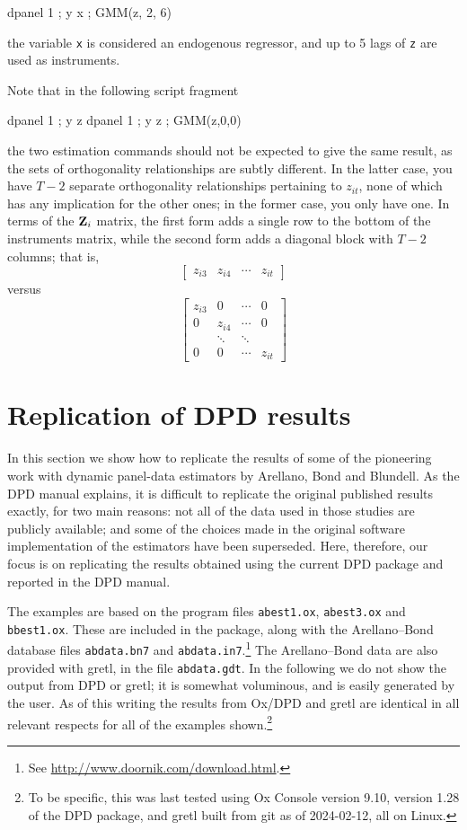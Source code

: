 \begin{code}
  dpanel 1 ; y x ; GMM(z, 2, 6)
\end{code}
the variable \texttt{x} is considered an endogenous regressor, and up to
5 lags of \texttt{z} are used as instruments.

Note that in the following script fragment
\begin{code}
  dpanel 1 ; y z
  dpanel 1 ; y z ; GMM(z,0,0)
\end{code}
the two estimation commands should not be expected to give the same
result, as the sets of orthogonality relationships are subtly
different.  In the latter case, you have $T-2$ separate orthogonality
relationships pertaining to $z_{it}$, none of which has any
implication for the other ones; in the former case, you only have one.
In terms of the $\mathbf{Z}_i$ matrix, the first form adds a single row to
the bottom of the instruments matrix, while the second form adds a
diagonal block with $T-2$ columns; that is,
\[
  \left[ \begin{array}{cccc} z_{i3} & z_{i4} & \cdots & z_{it}
         \end{array}
  \right]
\]
versus
\[
  \left[ \begin{array}{cccc}
         z_{i3} & 0 & \cdots & 0 \\
         0 & z_{i4} & \cdots & 0 \\
          & \ddots & \ddots &  \\
         0 & 0 & \cdots & z_{it} 
         \end{array}
  \right]
\]

\section{Replication of DPD results}
\label{sec:DPD-replic}

In this section we show how to replicate the results of some of the
pioneering work with dynamic panel-data estimators by Arellano, Bond
and Blundell.  As the DPD manual \citep*{DPDmanual} explains, it is
difficult to replicate the original published results exactly, for two
main reasons: not all of the data used in those studies are publicly
available; and some of the choices made in the original software
implementation of the estimators have been superseded.  Here,
therefore, our focus is on replicating the results obtained using the
current DPD package and reported in the DPD manual.

The examples are based on the program files \texttt{abest1.ox},
\texttt{abest3.ox} and \texttt{bbest1.ox}. These are included in the
 package, along with the Arellano--Bond database files
\texttt{abdata.bn7} and \texttt{abdata.in7}.\footnote{See
  \url{http://www.doornik.com/download.html}.} The Arellano--Bond data
are also provided with gretl, in the file \texttt{abdata.gdt}. In the
following we do not show the output from DPD or gretl; it is somewhat
voluminous, and is easily generated by the user. As of this writing
the results from Ox/DPD and gretl are identical in all relevant
respects for all of the examples shown.\footnote{To be specific, this
  was last tested using Ox Console version 9.10, version 1.28 of the
  DPD package, and gretl built from git as of 2024-02-12, all on
  Linux.}

